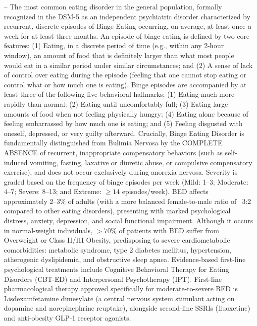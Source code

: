 -- The most common eating disorder in the general population, formally recognized in the DSM-5 as an independent psychiatric disorder characterized by recurrent, discrete episodes of Binge Eating occurring, on average, at least once a week for at least three months. An episode of binge eating is defined by two core features: (1) Eating, in a discrete period of time (e.g., within any 2-hour window), an amount of food that is definitely larger than what most people would eat in a similar period under similar circumstances; and (2) A sense of lack of control over eating during the episode (feeling that one cannot stop eating or control what or how much one is eating). Binge episodes are accompanied by at least three of the following five behavioral hallmarks: (1) Eating much more rapidly than normal; (2) Eating until uncomfortably full; (3) Eating large amounts of food when not feeling physically hungry; (4) Eating alone because of feeling embarrassed by how much one is eating; and (5) Feeling disgusted with oneself, depressed, or very guilty afterward. Crucially, Binge Eating Disorder is fundamentally distinguished from Bulimia Nervosa by the COMPLETE ABSENCE of recurrent, inappropriate compensatory behaviors (such as self-induced vomiting, fasting, laxative or diuretic abuse, or compulsive compensatory exercise), and does not occur exclusively during anorexia nervosa. Severity is graded based on the frequency of binge episodes per week (Mild: 1--3; Moderate: 4--7; Severe: 8--13; and Extreme: $\ge 14$ episodes/week). BED affects approximately 2--3\% of adults (with a more balanced female-to-male ratio of ~3:2 compared to other eating disorders), presenting with marked psychological distress, anxiety, depression, and social functional impairment. Although it occurs in normal-weight individuals, $>70\%$ of patients with BED suffer from Overweight or Class II/III Obesity, predisposing to severe cardiometabolic comorbidities: metabolic syndrome, type 2 diabetes mellitus, hypertension, atherogenic dyslipidemia, and obstructive sleep apnea. Evidence-based first-line psychological treatments include Cognitive Behavioral Therapy for Eating Disorders (CBT-ED) and Interpersonal Psychotherapy (IPT). First-line pharmacological therapy approved specifically for moderate-to-severe BED is Lisdexamfetamine dimesylate (a central nervous system stimulant acting on dopamine and norepinephrine reuptake), alongside second-line SSRIs (fluoxetine) and anti-obesity GLP-1 receptor agonists.

